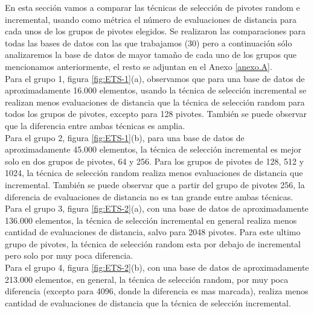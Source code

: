 En esta secci\'on vamos a comparar las t\'ecnicas de selecci\'on de pivotes random e incremental, usando como m\'etrica el n\'umero de evaluaciones de distancia para cada unos de los grupos de pivotes elegidos. Se realizaron las comparaciones para todas las bases de datos con las que trabajamos (30) pero a continuaci\'on s\'olo analizaremos la base de datos de mayor tama\~no de cada uno de los grupos que mencionamos anteriormente, el resto se adjuntan en el Anexo \ref{anexo.A}.\\

Para el grupo 1, figura \ref{fig:ETS-1}(a), observamos que para una base de datos de aproximadamente 16.000 elementos,  usando la t\'ecnica de selecci\'on incremental se realizan menos evaluaciones de distancia que la t\'ecnica de selecci\'on random para todos los grupos de pivotes, excepto para 128 pivotes. Tambi\'en se puede observar que la diferencia entre ambas t\'ecnicas es amplia.\\

Para el grupo 2, figura \ref{fig:ETS-1}(b), para una base de datos de aproximadamente 45.000 elementos, la t\'ecnica de selecci\'on incremental es mejor solo en dos grupos de pivotes, 64 y 256. Para los grupos de pivotes de 128, 512 y 1024, la t\'ecnica de selecci\'on random realiza menos evaluaciones de distancia que incremental. Tambi\'en se puede observar que a partir del grupo de pivotes 256, la diferencia de evaluaciones de distancia no es tan grande entre ambas t\'ecnicas.\\

Para el grupo 3, figura \ref{fig:ETS-2}(a), con una base de datos de aproximadamente 136.000 elementos, la t\'ecnica de selecci\'on incremental en general realiza menos cantidad de evaluaciones de distancia, salvo para 2048 pivotes. Para este ultimo grupo de pivotes, la t\'ecnica de selecci\'on random esta por debajo de incremental pero solo por muy poca diferencia.\\

Para el grupo 4, figura \ref{fig:ETS-2}(b), con una base de datos de aproximadamente 213.000 elementos, en general, la t\'ecnica de selecci\'on random, por muy poca diferencia (excepto para 4096, donde la diferencia es mas marcada), realiza menos cantidad de evaluaciones de distancia que la t\'ecnica de selecci\'on incremental.\\


